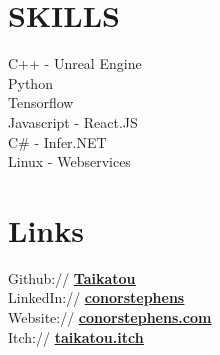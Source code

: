 \documentclass[]{deedy-resume-reversed}
\begin{document}
\begin{minipage}[t]{0.35\textwidth}

\section{SKILLS}
\textbullet{}   C++ - Unreal Engine\\
\textbullet{}   Python\\
\textbullet{}   Tensorflow\\
\textbullet{}   Javascript - React.JS\\
\textbullet{}   C\# - Infer.NET\\
\textbullet{}   Linux - Webservices\\
\sectionsep


\section{Links}
Github://
\underline{
    \href{https://github.com/Taikatou}{\bf Taikatou}
}
\\
LinkedIn://
\underline{
    \href{https://www.linkedin.com/in/conorstephens/}{\bf conorstephens}
}
\\
Website://
\underline{
    \href{http://conorstephens.com}{\bf conorstephens.com}
}
\\
Itch://
\underline{
    \href{https://taikatou.itch.io/}{\bf taikatou.itch}
}
\sectionsep


\end{minipage}
\end{document}
